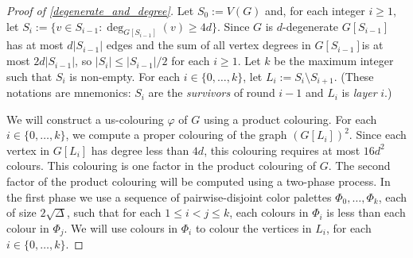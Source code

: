 \documentclass{patmorin}
\newcommand{\defin}[1]{\emph{\color{brightmaroon}#1}}
\begin{document}
\begin{proof}[Proof of \cref{degenerate_and_degree}]
  Let $S_0:=V(G)$ and, for each integer $i\ge 1$, let $S_i:=\{v\in S_{i-1}:\deg_{G[S_{i-1}]}(v)\ge 4d\}$.  Since $G$ is $d$-degenerate $G[S_{i-1}]$ has at most $d|S_{i-1}|$ edges and the sum of all vertex degrees in $G[S_{i-1}]$is at most $2d|S_{i-1}|$, so $|S_i|\le |S_{i-1}|/2$ for each $i\ge 1$.  Let $k$ be the maximum integer such that $S_i$ is non-empty.  For each $i\in\{0,\ldots,k\}$, let $L_i:=S_i\setminus S_{i+1}$.  (These notations are mnemonics: $S_i$ are the \defin{survivors} of round $i-1$ and $L_i$ is \defin{layer} $i$.)

  We will construct a us-colouring $\varphi$ of $G$ using a product colouring.  For each $i\in\{0,\ldots,k\}$, we compute a proper colouring of the graph $(G[L_i])^2$.  Since each vertex in $G[L_i]$ has degree less than $4d$,
  this colouring requires at most $16d^2$ colours.  This colouring is one factor in the product colouring of $G$.
  The second factor of the product colouring will be computed using a two-phase process. In the first phase we use a sequence of pairwise-disjoint color palettes $\Phi_0,\ldots,\Phi_{k}$, each of size $2\sqrt{\Delta}$, such that for each $1\le i < j\le k$, each colours in $\Phi_i$ is less than each colour in $\Phi_j$.  We will use colours in $\Phi_i$ to colour the vertices in $L_i$, for each $i\in\{0,\ldots,k\}$.



\end{proof}
\end{document}
